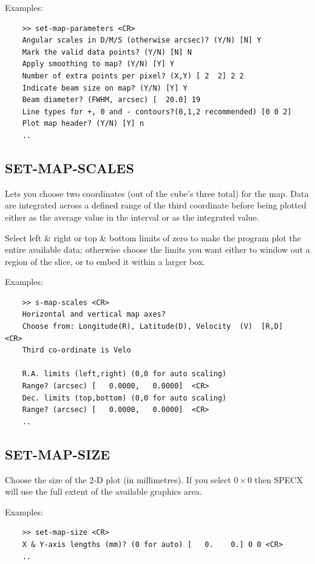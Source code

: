 \documentclass[11pt,twoside]{report}
\begin{document}
Examples:
\begin{verbatim}
    >> set-map-parameters <CR>
    Angular scales in D/M/S (otherwise arcsec)? (Y/N) [N] Y
    Mark the valid data points? (Y/N) [N] N
    Apply smoothing to map? (Y/N) [Y] Y
    Number of extra points per pixel? (X,Y) [ 2  2] 2 2
    Indicate beam size on map? (Y/N) [Y] Y
    Beam diameter? (FWHM, arcsec) [  20.0] 19
    Line types for +, 0 and - contours?(0,1,2 recommended) [0 0 2]
    Plot map header? (Y/N) [Y] n
    ..
\end{verbatim}


\subsection{SET-MAP-SCALES} 

Lets you choose two coordinates (out of the cube's three total) for the map.
Data are integrated across a defined range of the third coordinate before
being plotted either as the average value in the interval or as the
integrated value.

Select left \& right or top \& bottom limits of zero to make the program plot
the entire available data; otherwise choose the limits you want either to
window out a region of the slice, or to embed it within a larger box.

Examples:
\begin{verbatim}
    >> s-map-scales <CR>
    Horizontal and vertical map axes?
    Choose from: Longitude(R), Latitude(D), Velocity  (V)  [R,D]    <CR>
    Third co-ordinate is Velo

    R.A. limits (left,right) (0,0 for auto scaling)
    Range? (arcsec) [   0.0000,   0.0000]  <CR>
    Dec. limits (top,bottom) (0,0 for auto scaling)
    Range? (arcsec) [   0.0000,   0.0000]  <CR>
    ..
\end{verbatim}

\subsection{SET-MAP-SIZE} 

Choose the size of the 2-D plot (in millimetres). If you select $0\times 0$
then SPECX will use the full extent of the available graphics area.

Examples:
\begin{verbatim}
    >> set-map-size <CR>
    X & Y-axis lengths (mm)? (0 for auto) [   0.    0.] 0 0 <CR>
    ..
\end{verbatim}
\end{document}
